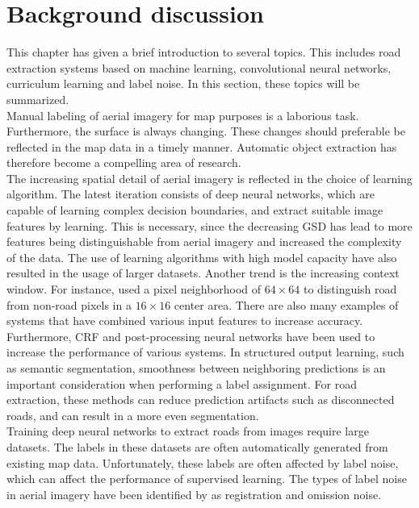 \section{Background discussion}
\label{sec:backgroundDiscussion}
This chapter has given a brief introduction to several topics. This includes road extraction systems based on machine learning, convolutional neural networks, curriculum learning and label noise. In this section, these topics will be summarized. \\

Manual labeling of aerial imagery for map purposes is a laborious task. Furthermore, the surface is always changing. These changes should preferable be reflected in the map data in a timely manner. Automatic object extraction has therefore become a compelling area of research.\\

The increasing spatial detail of aerial imagery is reflected in the choice of learning algorithm. The latest iteration consists of deep neural networks, which are capable of learning complex decision boundaries, and extract suitable image features by learning. This is necessary, since the decreasing \ac{GSD} has lead to more features being distinguishable from aerial imagery and increased the complexity of the data. The use of learning algorithms with high model capacity have also resulted in the usage of larger datasets. Another trend is the increasing context window. For instance, \cite{Mnih_roads_high_res_aerial_images} used a pixel neighborhood of $64 \times 64$ to distinguish road from non-road pixels in a $16 \times 16$ center area. There are also many examples of systems that have combined various input features to increase accuracy.\\

Furthermore, \ac{CRF} and post-processing neural networks have been used to increase the performance of various systems. In structured output learning, such as semantic segmentation, smoothness between neighboring predictions is an important consideration when performing a label assignment. For road extraction, these methods can reduce prediction artifacts such as disconnected roads, and can result in a more even segmentation.\\

Training deep neural networks to extract roads from images require large datasets. The labels in these datasets are often automatically generated from existing map data. Unfortunately, these labels are often affected by label noise, which can affect the performance of supervised learning. The types of label noise in aerial imagery have been identified by \cite{Mnih_aerial_images_noisy} as registration and omission noise.  \\


